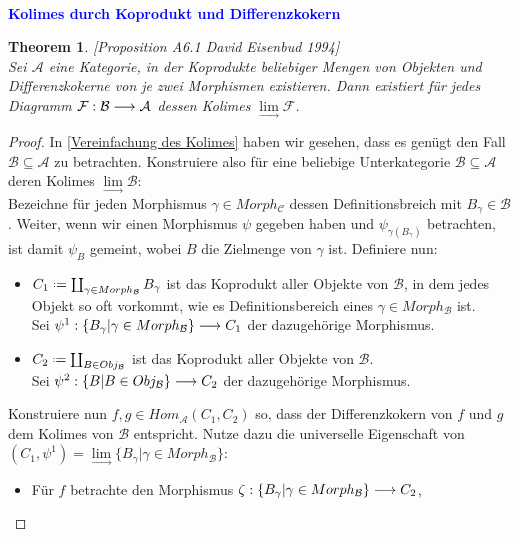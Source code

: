 \documentclass[10pt,a4paper]{report}
\newcommand{\ModulsOfDifferenzials}{David Eisenbud 1994}
\newcounter{Aussage}[chapter]
\newtheorem{theorem}[Aussage]{Theorem}
\newcommand{\functionfront}[3]{\nolinebreak{#1:#2 \longrightarrow #3}}
\newcommand{\colimes}[0]{\lim\limits_{ \longrightarrow }}
\newcommand*{\defeq}{\mathrel{\vcenter{\baselineskip0.5ex \lineskiplimit0pt
                     \hbox{\scriptsize.}\hbox{\scriptsize.}}}%
                     =}
\begin{document}
\ \\
\textcolor{blue}{\textbf{Kolimes durch Koprodukt und Differenzkokern}}
\begin{theorem}\label{Kolimes durch Koprodukt und Differenzkokern} \textit{[Proposition A6.1 \ModulsOfDifferenzials]}\\
Sei $\mathcal{A}$ eine Kategorie, in der Koprodukte beliebiger Mengen von Objekten und Differenzkokerne von je zwei Morphismen existieren. Dann existiert für jedes Diagramm $\functionfront{\mathcal{F}}{\mathcal{B}}{\mathcal{A}}$ dessen Kolimes $\colimes \mathcal{F}$.
\end{theorem}
\begin{proof}
In \cref{Vereinfachung des Kolimes} haben wir gesehen, dass es genügt den Fall $\mathcal{B} \subseteq \mathcal{A}$ zu betrachten. Konstruiere also für eine beliebige Unterkategorie $\mathcal{B} \subseteq \mathcal{A}$ deren Kolimes $\colimes\mathcal{B}$:\\
Bezeichne für jeden Morphismus $\gamma \in Morph_{\mathcal{C}}$ dessen Definitionsbreich mit $B_{\gamma} \in \mathcal{B}$. Weiter, wenn wir einen Morphismus $\psi$ gegeben haben und $\psi_{\gamma(B_{\gamma})}$ betrachten, ist damit $\psi_{B}$ gemeint, wobei $B$ die Zielmenge von $\gamma$ ist. Definiere nun:
\begin{itemize}
\item $C_1 \defeq \coprod_{\gamma \in Morph_{\mathcal{B}}} B_{\gamma}$ ist das Koprodukt aller Objekte von $\mathcal{B}$, in dem jedes Objekt so oft vorkommt, wie es Definitionsbereich eines $\gamma \in Morph_{\mathcal{B}}$ ist.\\
Sei $\functionfront{\psi^1}{\lbrace B_{\gamma} \vert \gamma \in Morph_{\mathcal{B}}\rbrace}{C_1}$ der dazugehörige Morphismus.
\item $C_2 \defeq \coprod_{B \in Obj_\mathcal{B}}$ ist das Koprodukt aller Objekte von $\mathcal{B}$.\\
Sei $\functionfront{\psi^2}{\lbrace B \vert B \in Obj_\mathcal{B} \rbrace}{C_2}$ der dazugehörige Morphismus.
\end{itemize}
Konstruiere nun $f,g \in Hom_{\mathcal{A}}(C_1,C_2)$ so, dass der Differenzkokern von $f$ und $g$ dem Kolimes von $\mathcal{B}$ entspricht. Nutze dazu die universelle Eigenschaft von $(C_1,\psi^1) = \colimes \lbrace B_{\gamma} \vert \gamma \in Morph_{\mathcal{B}}\rbrace$:
\begin{itemize}
\item[]
Für $f$ betrachte den Morphismus $\functionfront{\zeta}{\lbrace B_{\gamma} \vert \gamma \in Morph_{\mathcal{B}}\rbrace}{C_2}$,\\

\end{itemize}
\end{proof}
\end{document}
